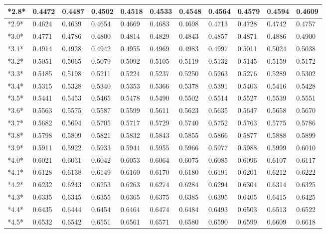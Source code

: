 \documentclass[margin=0.5in]{article}
\begin{document}
\begin{center}
\begin{tabular}{|l|l|l|l|l|l|l|l|l|l|l|}
\hline
*2.8* & 0.4472 & 0.4487 & 0.4502 & 0.4518 & 0.4533 & 0.4548 & 0.4564 & 0.4579 & 0.4594 & 0.4609 \\
\hline
*2.9* & 0.4624 & 0.4639 & 0.4654 & 0.4669 & 0.4683 & 0.4698 & 0.4713 & 0.4728 & 0.4742 & 0.4757 \\
\hline
*3.0* & 0.4771 & 0.4786 & 0.4800 & 0.4814 & 0.4829 & 0.4843 & 0.4857 & 0.4871 & 0.4886 & 0.4900 \\
\hline
*3.1* & 0.4914 & 0.4928 & 0.4942 & 0.4955 & 0.4969 & 0.4983 & 0.4997 & 0.5011 & 0.5024 & 0.5038 \\
\hline
*3.2* & 0.5051 & 0.5065 & 0.5079 & 0.5092 & 0.5105 & 0.5119 & 0.5132 & 0.5145 & 0.5159 & 0.5172 \\
\hline
*3.3* & 0.5185 & 0.5198 & 0.5211 & 0.5224 & 0.5237 & 0.5250 & 0.5263 & 0.5276 & 0.5289 & 0.5302 \\
\hline
*3.4* & 0.5315 & 0.5328 & 0.5340 & 0.5353 & 0.5366 & 0.5378 & 0.5391 & 0.5403 & 0.5416 & 0.5428 \\
\hline
*3.5* & 0.5441 & 0.5453 & 0.5465 & 0.5478 & 0.5490 & 0.5502 & 0.5514 & 0.5527 & 0.5539 & 0.5551 \\
\hline
*3.6* & 0.5563 & 0.5575 & 0.5587 & 0.5599 & 0.5611 & 0.5623 & 0.5635 & 0.5647 & 0.5658 & 0.5670 \\
\hline
*3.7* & 0.5682 & 0.5694 & 0.5705 & 0.5717 & 0.5729 & 0.5740 & 0.5752 & 0.5763 & 0.5775 & 0.5786 \\
\hline
*3.8* & 0.5798 & 0.5809 & 0.5821 & 0.5832 & 0.5843 & 0.5855 & 0.5866 & 0.5877 & 0.5888 & 0.5899 \\
\hline
*3.9* & 0.5911 & 0.5922 & 0.5933 & 0.5944 & 0.5955 & 0.5966 & 0.5977 & 0.5988 & 0.5999 & 0.6010 \\
\hline
*4.0* & 0.6021 & 0.6031 & 0.6042 & 0.6053 & 0.6064 & 0.6075 & 0.6085 & 0.6096 & 0.6107 & 0.6117 \\
\hline
*4.1* & 0.6128 & 0.6138 & 0.6149 & 0.6160 & 0.6170 & 0.6180 & 0.6191 & 0.6201 & 0.6212 & 0.6222 \\
\hline
*4.2* & 0.6232 & 0.6243 & 0.6253 & 0.6263 & 0.6274 & 0.6284 & 0.6294 & 0.6304 & 0.6314 & 0.6325 \\
\hline
*4.3* & 0.6335 & 0.6345 & 0.6355 & 0.6365 & 0.6375 & 0.6385 & 0.6395 & 0.6405 & 0.6415 & 0.6425 \\
\hline
*4.4* & 0.6435 & 0.6444 & 0.6454 & 0.6464 & 0.6474 & 0.6484 & 0.6493 & 0.6503 & 0.6513 & 0.6522 \\
\hline
*4.5* & 0.6532 & 0.6542 & 0.6551 & 0.6561 & 0.6571 & 0.6580 & 0.6590 & 0.6599 & 0.6609 & 0.6618 \\

\end{tabular}
\end{center}
\end{document}

